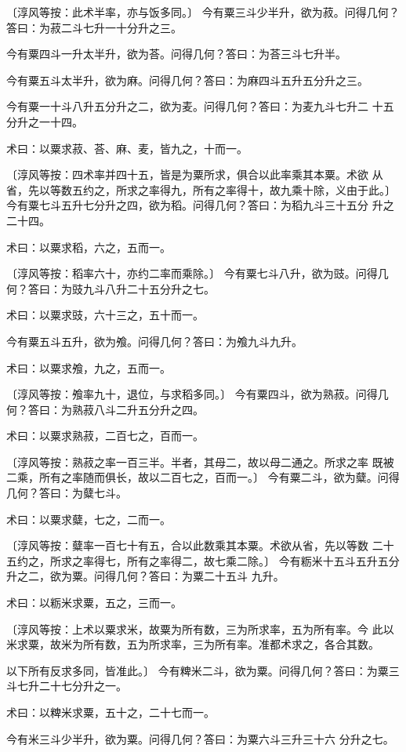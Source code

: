 \documentclass[a4paper,12pt,UTF8,twoside]{ctexbook}
\begin{document}
〔淳风等按：此术半率，亦与饭多同。〕 今有粟三斗少半升，欲为菽。问得几何？答曰：为菽二斗七升一十分升之三。

今有粟四斗一升太半升，欲为荅。问得几何？答曰：为荅三斗七升半。

今有粟五斗太半升，欲为麻。问得几何？答曰：为麻四斗五升五分升之三。

今有粟一十斗八升五分升之二，欲为麦。问得几何？答曰：为麦九斗七升二 十五分升之一十四。

术曰：以粟求菽、荅、麻、麦，皆九之，十而一。

〔淳风等按：四术率并四十五，皆是为粟所求，俱合以此率乘其本粟。术欲 从省，先以等数五约之，所求之率得九，所有之率得十，故九乘十除，义由于此。〕 今有粟七斗五升七分升之四，欲为稻。问得几何？答曰：为稻九斗三十五分 升之二十四。

术曰：以粟求稻，六之，五而一。

〔淳风等按：稻率六十，亦约二率而乘除。〕 今有粟七斗八升，欲为豉。问得几何？答曰：为豉九斗八升二十五分升之七。

术曰：以粟求豉，六十三之，五十而一。

今有粟五斗五升，欲为飧。问得几何？答曰：为飧九斗九升。

术曰：以粟求飧，九之，五而一。

〔淳风等按：飧率九十，退位，与求稻多同。〕 今有粟四斗，欲为熟菽。问得几何？答曰：为熟菽八斗二升五分升之四。

术曰：以粟求熟菽，二百七之，百而一。

〔淳风等按：熟菽之率一百三半。半者，其母二，故以母二通之。所求之率 既被二乘，所有之率随而俱长，故以二百七之，百而一。〕 今有粟二斗，欲为糵。问得几何？答曰：为糵七斗。

术曰：以粟求糵，七之，二而一。

〔淳风等按：糵率一百七十有五，合以此数乘其本粟。术欲从省，先以等数 二十五约之，所求之率得七，所有之率得二，故七乘二除。〕 今有粝米十五斗五升五分升之二，欲为粟。问得几何？答曰：为粟二十五斗 九升。

术曰：以粝米求粟，五之，三而一。

〔淳风等按：上术以粟求米，故粟为所有数，三为所求率，五为所有率。今 此以米求粟，故米为所有数，五为所求率，三为所有率。准都术求之，各合其数。

以下所有反求多同，皆准此。〕 今有粺米二斗，欲为粟。问得几何？答曰：为粟三斗七升二十七分升之一。

术曰：以粺米求粟，五十之，二十七而一。

今有米三斗少半升，欲为粟。问得几何？答曰：为粟六斗三升三十六 分升之七。
\end{document}
